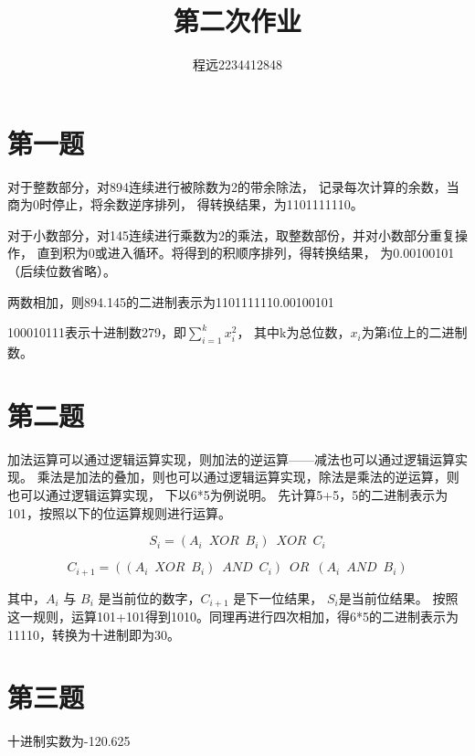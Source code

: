 \documentclass[UTF8]{ctexart}
\begin{document}
\title{\vspace{0cm}第二次作业}
\author{程远2234412848}
\date{}
\maketitle

\section{第一题}
对于整数部分，对894连续进行被除数为2的带余除法，
记录每次计算的余数，当商为0时停止，将余数逆序排列，
得转换结果，为1101111110。

对于小数部分，对145连续进行乘数为2的乘法，取整数部份，并对小数部分重复操作，
直到积为0或进入循环。将得到的积顺序排列，得转换结果，
为0.00100101（后续位数省略）。

两数相加，则894.145的二进制表示为1101111110.00100101

100010111表示十进制数279，即$ \sum_{i=1}^{k} x^{2}_{i} $，
其中k为总位数，$ x_{i} $为第i位上的二进制数。

\section{第二题}
加法运算可以通过逻辑运算实现，则加法的逆运算——减法也可以通过逻辑运算实现。
乘法是加法的叠加，则也可以通过逻辑运算实现，除法是乘法的逆运算，则也可以通过逻辑运算实现，
下以6*5为例说明。
先计算5+5，5的二进制表示为101，按照以下的位运算规则进行运算。
\begin{center}

    \begin{equation}
        S_{i} = (A_{i} \,\,\, XOR \,\,\, B_{i}) \,\,\, XOR \,\,\, C_{i} 
    \end{equation}

    \begin{equation}
        C_{i+1} = ((A_{i} \,\,\, XOR \,\,\, B_{i}) \,\,\, AND \,\,\, C_{i}) 
        \,\,\, OR \,\,\, (A_{i} \,\,\, AND \,\,\, B_{i})
    \end{equation}

\end{center}
其中，$ A_{i} $ 与 $ B _{i} $ 是当前位的数字，$ C_{i+1} $ 是下一位结果， $ S_{i} $是当前位结果。
按照这一规则，运算101+101得到1010。同理再进行四次相加，得6*5的二进制表示为11110，转换为十进制即为30。

\section{第三题}
十进制实数为-120.625
\end{document}
